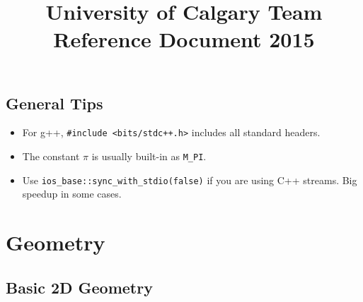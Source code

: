 \documentclass[letterpaper]{article}
\begin{document}
\title{University of Calgary Team Reference Document 2015}
\maketitle
\thispagestyle{myheadings}

\begin{multicols*}{2}

\tableofcontents

\section{General Tips}
\begin{itemize}
\item For g++, \texttt{\#include <bits/stdc++.h>} includes all standard headers.
\item The constant $\pi$ is usually built-in as \texttt{M\_PI}.
\item Use \texttt{ios\_base::sync\_with\_stdio(false)} if you are using C++ streams. Big speedup in some cases.
\end{itemize}

\end{multicols*}

\section{Geometry}

\subsection{Basic 2D Geometry}
\end{document}
